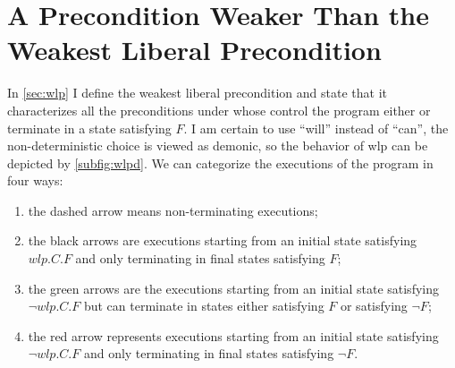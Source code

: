 \section{A Precondition Weaker Than the Weakest Liberal Precondition}
In \autoref{sec:wlp} I define the weakest liberal precondition and state that it characterizes all the preconditions under whose control the program either  or  terminate in a state satisfying $F$. 
I am certain to use ``will'' instead of ``can'', the non-deterministic choice is viewed as demonic, so the behavior of wlp can be depicted by \autoref{subfig:wlpd}. 
We can categorize the executions of the program in four ways: 
\begin{enumerate}
	\item the dashed arrow means non-terminating executions; 
	\item the black arrows are executions starting from an initial state satisfying $wlp.C.F$ and only terminating in final states satisfying $F$; 
	\item the green arrows are the executions starting from an initial state satisfying $\neg wlp.C.F$ but can terminate in states either satisfying $F$ or satisfying $\neg F$;
	\item the red arrow represents executions starting from an initial state satisfying $\neg wlp.C.F$ and only terminating in final states satisfying $\neg F$. 
\end{enumerate}


